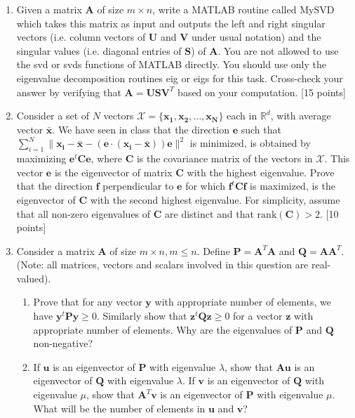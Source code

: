 \documentclass[11pt]{article}
\begin{document}
\begin{enumerate}
\item Given a matrix $\boldsymbol{A}$ of size $m \times n$, write a MATLAB routine called MySVD which takes this matrix as input and outputs the left and right singular vectors (i.e. column vectors of $\boldsymbol{U}$ and $\boldsymbol{V}$ under usual notation) and the singular values (i.e. diagonal entries of $\boldsymbol{S}$) of $\boldsymbol{A}$. You are not allowed to use the \textsf{svd} or \textsf{svds} functions of MATLAB directly. You should use only the eigenvalue decomposition routines \textsf{eig} or \textsf{eigs} for this task. Cross-check your answer by verifying that $\boldsymbol{A} = \boldsymbol{USV}^T$ based on your computation. \textsf{[15 points]}

\item Consider a set of $N$ vectors $\mathcal{X} = \{\boldsymbol{x_1}, \boldsymbol{x_2}, ..., \boldsymbol{x_N}\}$ each in $\mathbb{R}^d$, with average vector $\boldsymbol{\bar{x}}$. We have seen in class that the direction $\boldsymbol{e}$ such that $\sum_{i=1}^N \|\boldsymbol{x_i}-\boldsymbol{\bar{x}}-(\boldsymbol{e} \cdot (\boldsymbol{x_i}-\boldsymbol{\bar{x}}))\boldsymbol{e}\|^2$ is minimized, is obtained by maximizing $\boldsymbol{e}^t \boldsymbol{C} \boldsymbol{e}$, where $\boldsymbol{C}$ is the covariance matrix of the vectors in $\mathcal{X}$. This vector $\boldsymbol{e}$ is the eigenvector of matrix $\boldsymbol{C}$ with the highest eigenvalue. Prove that the direction $\boldsymbol{f}$ perpendicular to $\boldsymbol{e}$ for which $\boldsymbol{f}^t \boldsymbol{C} \boldsymbol{f}$ is maximized, is the eigenvector of $\boldsymbol{C}$ with the second highest eigenvalue. For simplicity, assume that all non-zero eigenvalues of $\boldsymbol{C}$ are distinct and that $\textrm{rank}(\boldsymbol{C}) > 2$. \textsf{[10 points]}

\item Consider a matrix $\boldsymbol{A}$ of size $m \times n, m \leq n$. Define $\boldsymbol{P} = \boldsymbol{A}^T \boldsymbol{A}$ and $\boldsymbol{Q} = \boldsymbol{A}\boldsymbol{A}^T$. (Note: all matrices, vectors and scalars involved in this question are real-valued).
\begin{enumerate}
\item Prove that for any vector $\boldsymbol{y}$ with appropriate number of elements, we have $\boldsymbol{y}^t \boldsymbol{Py} \geq 0$. Similarly show that $\boldsymbol{z}^t \boldsymbol{Qz} \geq 0$ for a vector $\boldsymbol{z}$ with appropriate number of elements. Why are the eigenvalues of $\boldsymbol{P}$ and $\boldsymbol{Q}$ non-negative?
\item If $\boldsymbol{u}$ is an eigenvector of $\boldsymbol{P}$ with eigenvalue $\lambda$, show that $\boldsymbol{Au}$ is an eigenvector of $\boldsymbol{Q}$ with eigenvalue $\lambda$. If $\boldsymbol{v}$ is an eigenvector of $\boldsymbol{Q}$ with eigenvalue $\mu$, show that $\boldsymbol{A}^T\boldsymbol{v}$ is an eigenvector of $\boldsymbol{P}$ with eigenvalue $\mu$. What will be the number of elements in $\boldsymbol{u}$ and $\boldsymbol{v}$?


\end{enumerate}
\end{enumerate}
\end{document}
